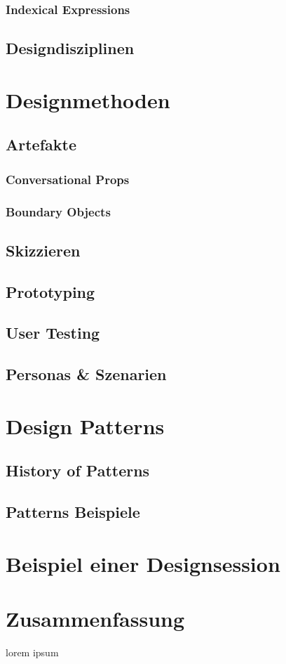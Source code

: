\subsubsection{Indexical Expressions}
\subsection{Designdisziplinen}

\section{Designmethoden}
\subsection{Artefakte}
\subsubsection{Conversational Props}
\subsubsection{Boundary Objects}
\subsection{Skizzieren}
\subsection{Prototyping}
\subsection{User Testing}
\subsection{Personas \& Szenarien}

\section{Design Patterns}\label{sec:designPatterns}
\subsection{History of Patterns}
\subsection{Patterns Beispiele}

\section{Beispiel einer Designsession}

\section*{Zusammenfassung}
lorem ipsum